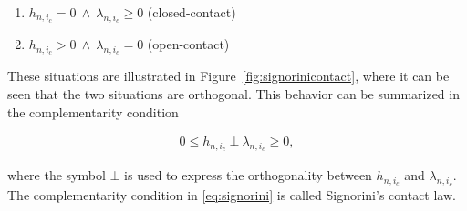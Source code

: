 \documentclass[../DC2017114Bouma.tex]{subfiles}
\begin{document}
\begin{enumerate}
\item $h_{n,i_c}=0\ \wedge\ \lambda_{n,i_c} \geq 0$ (closed-contact)
\item $h_{n,i_c}>0\ \wedge\ \lambda_{n,i_c} = 0$ (open-contact)
\end{enumerate}

These situations are illustrated in Figure~\ref{fig:signorinicontact}, where it can be seen that the two situations are orthogonal. This behavior can be summarized in the complementarity condition

\begin{align}
0\leq h_{n,i_c}\ \bot\ \lambda_{n,i_c} \geq 0,\label{eq:signorini}
\end{align}

where the symbol $\bot$ is used to express the orthogonality between $h_{n,i_c}$ and $\lambda_{n,i_c}$. The complementarity condition in \eqref{eq:signorini} is called Signorini's contact law.
\end{document}
